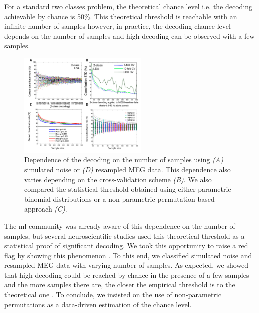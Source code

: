 \documentclass[a4paper,11pt]{article}
\begin{document}
For a standard two classes problem, the theoretical chance level i.e. the decoding achievable by chance is 50\%. This theoretical threshold is reachable with an infinite number of samples however, in practice, the decoding chance-level depends on the number of samples and high decoding can be observed with a few samples.

\begin{figure} %
    \centering
    \includegraphics[width=0.55\textwidth]{figures/report/chance_level.png}
    \caption{Dependence of the decoding on the number of samples using \textit{(A)} simulated noise or \textit{(D)} resampled MEG data. This dependence also varies depending on the cross-validation scheme \textit{(B)}. We also compared the statistical threshold obtained using either parametric binomial distributions or a non-parametric permutation-based approach \textit{(C)}.}
    \label{fig_chance_level}
\end{figure}

The \ac{ml} community was already aware of this dependence on the number of samples, but several neuroscientific studies used this theoretical threshold as a statistical proof of significant decoding. We took this opportunity to raise a red flag by showing this phenomenon \citep{combrisson2015exceeding}. To this end, we classified simulated noise and resampled MEG data with varying number of samples. As expected, we showed that high-decoding could be reached by chance in the presence of a few samples and the more samples there are, the closer the empirical threshold is to the theoretical one . To conclude, we insisted on the use of non-parametric permutations as a data-driven estimation of the chance level.

\end{document}
